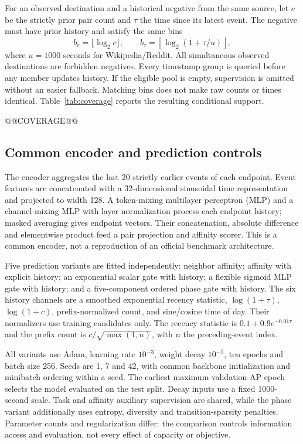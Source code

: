 For an observed destination and a historical negative from the same source, let $c$ be the strictly prior pair count and $\tau$ the time since its latest event. The negative must have prior history and satisfy the same bins
\begin{equation}\label{eq:matching}
b_c=\lfloor\log_2 c\rfloor,\qquad
b_\tau=\left\lfloor\log_2(1+\tau/u)\right\rfloor,
\end{equation}
where $u=1000$ seconds for Wikipedia/Reddit. All simultaneous observed destinations are forbidden negatives. Every timestamp group is queried before any member updates history. If the eligible pool is empty, supervision is omitted without an easier fallback. Matching bins does not make raw counts or times identical. Table~\ref{tab:coverage} reports the resulting conditional support.

@@COVERAGE@@

\subsection{Common encoder and prediction controls}
The encoder aggregates the last 20 strictly earlier events of each endpoint. Event features are concatenated with a 32-dimensional sinusoidal time representation and projected to width 128. A token-mixing multilayer perceptron (MLP) and a channel-mixing MLP with layer normalization process each endpoint history; masked averaging gives endpoint vectors. Their concatenation, absolute difference and elementwise product feed a pair projection and affinity scorer. This is a common encoder, not a reproduction of an official benchmark architecture.

Five prediction variants are fitted independently: neighbor affinity; affinity with explicit history; an exponential scalar gate with history; a flexible sigmoid MLP gate with history; and a five-component ordered phase gate with history. The six history channels are a smoothed exponential recency statistic, $\log(1+\tau)$, $\log(1+c)$, prefix-normalized count, and sine/cosine time of day. Their normalizers use training candidates only. The recency statistic is $0.1+0.9e^{-0.01\tau}$ and the prefix count is $c/\sqrt{\max(1,n)}$, with $n$ the preceding-event index.

All variants use Adam, learning rate $10^{-3}$, weight decay $10^{-5}$, ten epochs and batch size 256. Seeds are 1, 7 and 42, with common backbone initialization and minibatch ordering within a seed. The earliest maximum-validation-AP epoch selects the model evaluated on the test split. Decay inputs use a fixed 1000-second scale. Task and affinity auxiliary supervision are shared, while the phase variant additionally uses entropy, diversity and transition-sparsity penalties. Parameter counts and regularization differ: the comparison controls information access and evaluation, not every effect of capacity or objective.

